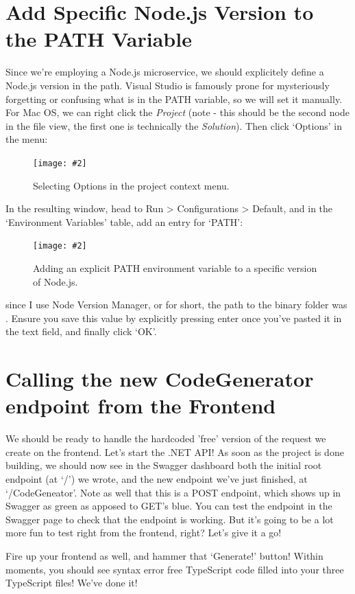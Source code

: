 \documentclass[a4paper,headinclude=on,footinclude=on,12pt,oneside]{scrbook}
\newcommand{\standardfigure}[3]{\begin{figure}[H]\begin{center}\texttt{[image: \#2]}\caption{#3}\label{fig:#2}\end{center}\end{figure}}
\begin{document}
\section{Add Specific Node.js Version to the PATH Variable}

Since we're employing a Node.js microservice, we should explicitely define a Node.js version in the path. Visual Studio is famously prone for mysteriously forgetting or confusing what is in the PATH variable, so we will set it manually. For Mac OS, we can right click the \textit{Project} (note - this should be the second node in the file view, the first one is technically the \textit{Solution}). Then click `Options' in the menu:

\standardfigure{\textwidth/2}{/backend/project-options}{Selecting Options in the project context menu.}

In the resulting window, head to Run > Configurations > Default, and in the `Environment Variables' table, add an entry for `PATH':

\standardfigure{\textwidth}{/backend/project-environment-variables}{Adding an explicit PATH environment variable to a specific version of Node.js.}

since I use Node Version Manager, or  for short, the path to the binary folder was . Ensure you save this value by explicitly pressing enter once you've pasted it in the text field, and finally click `OK'.

\section{Calling the new CodeGenerator endpoint from the Frontend}

We should be ready to handle the hardcoded 'free' version of the request we create on the frontend. Let's start the .NET API! As soon as the project is done building, we should now see in the Swagger dashboard both the initial root endpoint (at `/') we wrote, and the new endpoint we've just finished, at `/CodeGeneator'. Note as well that this is a POST endpoint, which shows up in Swagger as green as apposed to GET's blue. You can test the endpoint in the Swagger page to check that the endpoint is working. But it's going to be a lot more fun to test right from the frontend, right? Let's give it a go!

Fire up your frontend as well, and hammer that `Generate!' button! Within moments, you should see syntax error free TypeScript code filled into your three TypeScript files! We've done it!
\end{document}
